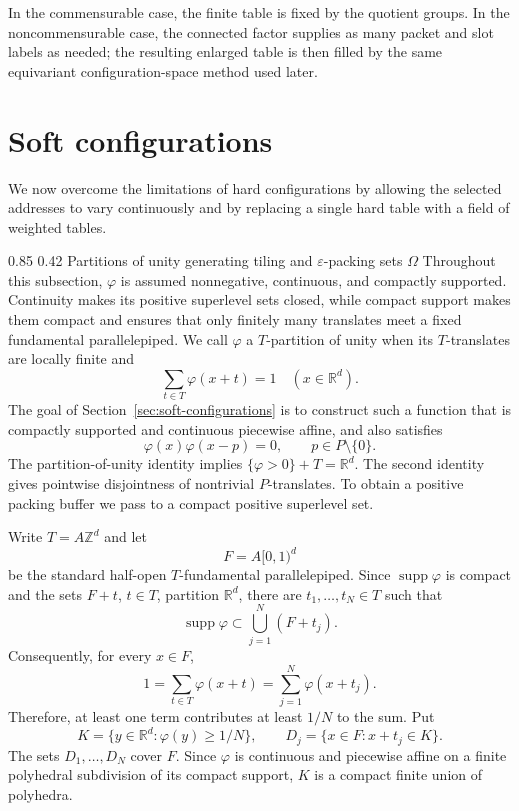 \documentclass[11pt,reqno]{amsart}
\makeatletter
\numberwithin{equation}{section}
\renewcommand\subsection{\@startsection{subsection}{2}{\z@}%
  {0.85\baselineskip \@plus 0.25\baselineskip \@minus 0.10\baselineskip}%
  {0.42\baselineskip}%
  {\normalfont\bfseries}}
\theoremstyle{definition}
\theoremstyle{remark}
\newcommand{\R}{\mathbb R}
\newcommand{\Z}{\mathbb Z}
\newcommand{\supp}{\operatorname{supp}}
\makeatother
\begin{document}
In the commensurable case, the finite table is fixed by the quotient groups.
In the noncommensurable case, the connected factor supplies as many packet
and slot labels as needed; the resulting enlarged table is then filled by
the same equivariant configuration-space method used later.


\section{Soft configurations}\label{sec:hard-configurations}

We now overcome the limitations of hard configurations by allowing the
selected addresses to vary continuously and by replacing a single hard table
with a field of weighted tables.

\subsection{Partitions of unity generating tiling and
$\varepsilon$-packing sets $\Omega$}
Throughout this subsection, $\varphi$ is assumed nonnegative, continuous,
and compactly supported.  Continuity makes its positive superlevel sets
closed, while compact support makes them compact and ensures that only
finitely many translates meet a fixed fundamental parallelepiped.  We call
$\varphi$ a $T$-partition of unity when its $T$-translates are locally finite and
\begin{equation}\label{eq:roadmap-partition-separation}
 \sum_{t\in T}\varphi(x+t)=1
 \quad (x\in\R^d).
\end{equation}
The goal of Section~\ref{sec:soft-configurations} is to construct such a
function that is compactly supported and continuous piecewise affine, and
also satisfies
\begin{equation}\label{eq:roadmap-pointwise-separation}
 \varphi(x)\varphi(x-p)=0,
 \qquad p\in P\setminus\{0\}.
\end{equation}
The partition-of-unity identity implies $\{\varphi>0\}+T=\R^d$.  The second
identity gives pointwise disjointness of nontrivial $P$-translates.  To obtain
a positive packing buffer we pass to a compact positive superlevel set.

Write $T=A\Z^d$ and let
\[
 F=A[0,1)^d
\]
be the standard half-open $T$-fundamental parallelepiped.  Since
$\supp\varphi$ is compact and the sets $F+t$, $t\in T$, partition $\R^d$,
there are $t_1,\ldots,t_N\in T$ such that
\[
 \supp\varphi\subset\bigcup_{j=1}^N(F+t_j).
\]
Consequently, for every $x\in F$,
\begin{equation}\label{eq:finite-roadmap-partition}
 1=\sum_{t\in T}\varphi(x+t)
  =\sum_{j=1}^N\varphi(x+t_j).
\end{equation}
Therefore, at least one term contributes at least $1/N$ to the sum.  Put
\[
 K=\{y\in\R^d:\varphi(y)\ge 1/N\},
 \qquad
 D_j=\{x\in F:x+t_j\in K\}.
\]
The sets $D_1,\ldots,D_N$ cover $F$.  Since $\varphi$ is continuous and
piecewise affine on a finite polyhedral subdivision of its compact support,
$K$ is a compact finite union of polyhedra.
\end{document}
